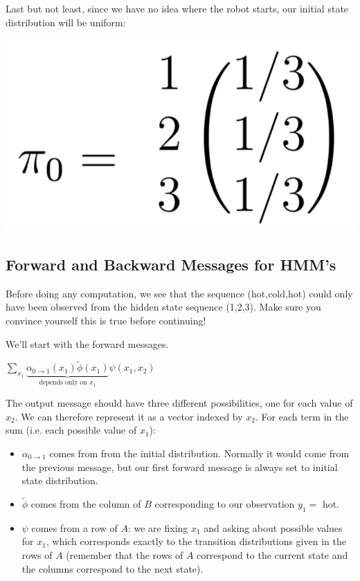 \documentclass[6008notes.tex]{subfiles}
\begin{document}
Last but not least, since we have no idea where the robot starts, our initial state distribution will be uniform:

{\centering\includegraphics[scale=0.25]{images_sec-formulating-hmm-helper3} \par}


\subsection{Forward and Backward Messages for HMM's}

Before doing any computation, we see that the sequence (hot,cold,hot) could only have been observed from the hidden state sequence (1,2,3). Make sure you convince yourself this is true before continuing!

We'll start with the forward messages.

{\centering$\sum _{x_1} \underbrace{\alpha _{0 \to 1}(x_1) \tilde{\phi }(x_1)}_{\text {depends only on $x_1$}} \psi (x_1,x_2)$ \par}

The output message should have three different possibilities, one for each value of $x_2$. We can therefore represent it as a vector indexed by $x_2$. For each term in the sum (i.e. each possible value of $x_1$):

\begin{itemize}
\item $\alpha _{0 \to 1}$ comes from from the initial distribution. Normally it would come from the previous message, but our first forward message is always set to initial state distribution.

\item $\tilde{\phi }$ comes from the column of $B$ corresponding to our observation $y_1=$ hot.

\item $\psi$ comes from a row of $A$: we are fixing $x_1$ and asking about possible values for $x_1$, which corresponds exactly to the transition distributions given in the rows of $A$ (remember that the rows of $A$ correspond to the current state and the columns correspond to the next state).
\end{itemize}
\end{document}

